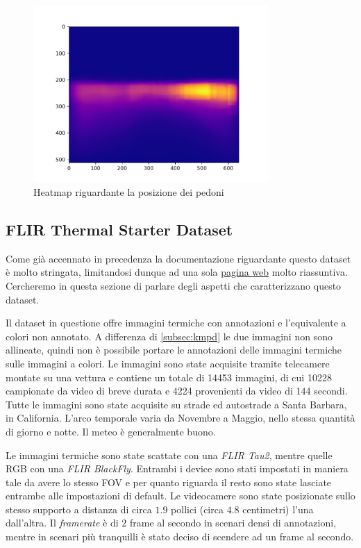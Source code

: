 \begin{figure}
    \centering
    \includegraphics[width=0.8\textwidth]{images/graphic/heatmap.pdf}
    \caption{Heatmap riguardante la posizione dei pedoni}
    \label{fig:heatmap}
\end{figure}
\subsection{FLIR Thermal Starter Dataset}
\label{subsec:flirdataset}
Come già accennato in precedenza la documentazione riguardante questo dataset è molto stringata, limitandosi dunque ad una sola \href{https://www.flir.com/oem/adas/adas-dataset-form/}{pagina web} molto riassuntiva. Cercheremo in questa sezione di parlare degli aspetti che caratterizzano questo dataset.

Il dataset in questione offre immagini termiche con annotazioni e l'equivalente a colori non annotato. A differenza di \ref{subsec:kmpd} le due immagini non sono allineate, quindi non è possibile portare le annotazioni delle immagini termiche sulle immagini a colori.
Le immagini sono state acquisite tramite telecamere montate su una vettura e contiene un totale di 14453 immagini, di cui 10228 campionate da video di breve durata e 4224 provenienti da video di 144 secondi.
Tutte le immagini sono state acquisite su strade ed autostrade a Santa Barbara, in California. L'arco temporale varia da Novembre a Maggio, nello stessa quantità di giorno e notte. Il meteo è generalmente buono.

Le immagini termiche sono state scattate con una \textit{FLIR Tau2}, mentre quelle RGB con una \textit{FLIR BlackFly}. Entrambi i device sono stati impostati in maniera tale da avere lo stesso \ac{FOV} e per quanto riguarda il resto sono state lasciate entrambe alle impostazioni di default. 
Le videocamere sono state posizionate sullo stesso supporto a distanza di circa $1.9$ pollici (circa $4.8$ centimetri) l'una dall'altra. Il \textit{framerate} è di $2$ frame al secondo in scenari densi di annotazioni, mentre in scenari più tranquilli è stato deciso di scendere ad un frame al secondo.

